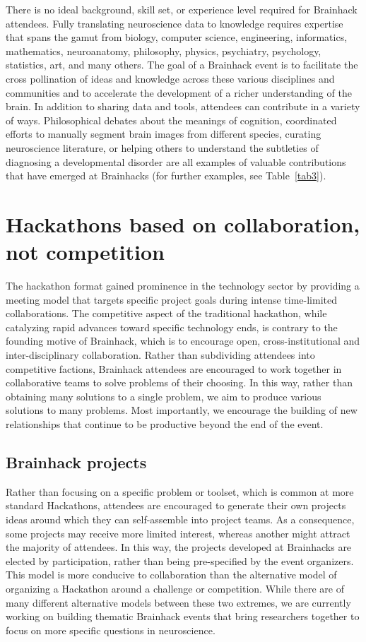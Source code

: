 \documentclass[11pt]{bmc_article_s50}
\begin{document}
There is no ideal background, skill set, or experience level required for Brainhack attendees. Fully translating neuroscience data to knowledge requires expertise that spans the gamut from biology, computer science, engineering, informatics, mathematics, neuroanatomy, philosophy, physics, psychiatry, psychology, statistics, art, and many others. The goal of a Brainhack event is to facilitate the cross pollination of ideas and knowledge across these various disciplines and communities and to accelerate the development of a richer understanding of the brain. In addition to sharing data and tools, attendees can contribute in a variety of ways. Philosophical debates about the meanings of cognition, coordinated efforts to manually segment brain images from different species, curating neuroscience literature, or helping others to understand the subtleties of diagnosing a developmental disorder are all examples of valuable contributions that have emerged at Brainhacks (for further examples, see Table~\ref{tab3}).

\section{Hackathons based on collaboration, not competition}

The hackathon format gained prominence in the technology sector by providing a meeting model that targets specific project goals during intense time-limited collaborations. The competitive aspect of the traditional hackathon, while catalyzing rapid advances toward specific technology ends, is contrary to the founding motive of Brainhack, which is to encourage open, cross-institutional and inter-disciplinary collaboration. Rather than subdividing attendees into competitive factions, Brainhack attendees are encouraged to work together in collaborative teams to solve problems of their choosing. In this way, rather than obtaining many solutions to a single problem, we aim to produce various solutions to many problems. Most importantly, we encourage the building of new relationships that continue to be productive beyond the end of the event.

\subsection{Brainhack projects}

Rather than focusing on a specific problem or toolset, which is common at more standard Hackathons, attendees are encouraged to generate their own projects ideas around which they can self-assemble into project teams. As a consequence, some projects may receive more limited interest, whereas another might attract the majority of attendees. In this way, the projects developed at Brainhacks are elected by participation, rather than being pre-specified by the event organizers. This model is more conducive to collaboration than the alternative model of organizing a Hackathon around a challenge or competition. While there are of many different alternative models between these two extremes, we are currently working on building thematic Brainhack events that bring researchers together to focus on more specific questions in neuroscience.
\end{document}
